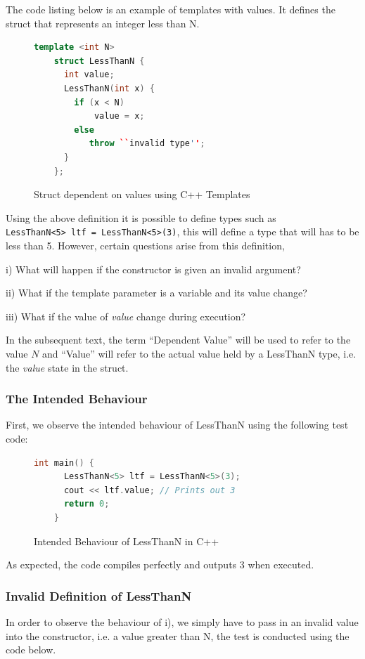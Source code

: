 \documentclass[a4paper,12pt]{report}
\begin{document}
\par
The code listing below is an example of templates with values. It defines the 
struct that represents an integer less than N. 

\begin{figure}[H]
  \begin{lstlisting}[language=c++]     
    template <int N>
    struct LessThanN {
      int value;
      LessThanN(int x) {
        if (x < N)
            value = x;
        else
           throw ``invalid type'';
      }
    };
  \end{lstlisting}
  \caption{Struct dependent on values using C++ Templates}
\end{figure}

\par
Using the above definition it is possible to define types such as \\
\verb+LessThanN<5> ltf = LessThanN<5>(3)+, this will define a type that will has 
to be less than 5. However, certain questions arise from this definition, 

i) What will happen if the constructor is given an invalid argument? 

ii) What if the template parameter is a variable and its 
value change? 

iii) What if the value of \textit{value} change during execution?

In the subsequent text, the term ``Dependent Value'' will be used to refer to the 
value $N$ and ``Value'' will refer to the actual value held by a LessThanN type, 
i.e. the \textit{value} state in the struct. 

\subsubsection{The Intended Behaviour}
First, we observe the intended behaviour of LessThanN using the following test 
code:
\begin{figure}[H]
  \begin{lstlisting}[language=c++]     
    int main() {
      LessThanN<5> ltf = LessThanN<5>(3);
      cout << ltf.value; // Prints out 3
      return 0;
    }
  \end{lstlisting}
  \caption{Intended Behaviour of LessThanN in C++}
\end{figure}

\par
As expected, the code compiles perfectly and outputs 3 when executed.

\subsubsection{Invalid Definition of LessThanN}
In order to observe the behaviour of i), we simply have to pass in an 
invalid value into the constructor, i.e. a value greater than N, 
the test is conducted using the code below. 
\end{document}
